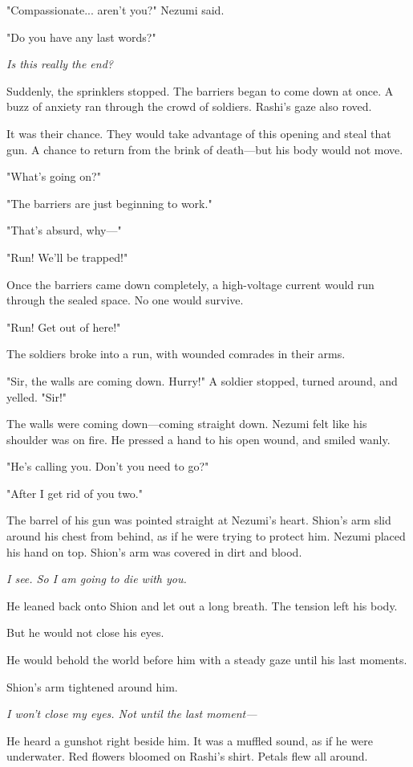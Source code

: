 "Compassionate... aren't you?" Nezumi said.

"Do you have any last words?"

\emph{Is this really the end?}

Suddenly, the sprinklers stopped. The barriers began to come down at
once. A buzz of anxiety ran through the crowd of soldiers. Rashi's gaze
also roved.

It was their chance. They would take advantage of this opening and steal
that gun. A chance to return from the brink of death---but his body would
not move.

"What's going on?"

"The barriers are just beginning to work."

"That's absurd, why---"

"Run! We'll be trapped!"

Once the barriers came down completely, a high-voltage current would run
through the sealed space. No one would survive.

"Run! Get out of here!"

The soldiers broke into a run, with wounded comrades in their arms.

"Sir, the walls are coming down. Hurry!" A soldier stopped, turned
around, and yelled. "Sir!"

The walls were coming down---coming straight down. Nezumi felt like his
shoulder was on fire. He pressed a hand to his open wound, and smiled
wanly.

"He's calling you. Don't you need to go?"

"After I get rid of you two."

The barrel of his gun was pointed straight at Nezumi's heart. Shion's
arm slid around his chest from behind, as if he were trying to protect
him. Nezumi placed his hand on top. Shion's arm was covered in dirt and
blood.

\emph{I see. So I am going to die with you.}

He leaned back onto Shion and let out a long breath. The tension left
his body.

But he would not close his eyes.

He would behold the world before him with a steady gaze until his last
moments.

Shion's arm tightened around him.

\emph{I won't close my eyes. Not until the last moment---}

He heard a gunshot right beside him. It was a muffled sound, as if he
were underwater. Red flowers bloomed on Rashi's shirt. Petals flew all
around.

